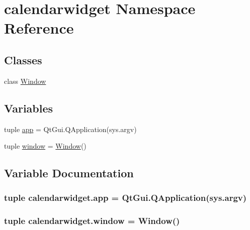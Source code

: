 \hypertarget{namespacecalendarwidget}{}\section{calendarwidget Namespace Reference}
\label{namespacecalendarwidget}
\subsection*{Classes}
\begin{DoxyCompactItemize}
\item 
class \hyperlink{classcalendarwidget_1_1Window}{Window}
\end{DoxyCompactItemize}
\subsection*{Variables}
\begin{DoxyCompactItemize}
\item 
tuple \hyperlink{namespacecalendarwidget_abebdb6897473e3b5be8ebdb33fcf8c40}{app} = Qt\+Gui.\+Q\+Application(sys.\+argv)
\item 
tuple \hyperlink{namespacecalendarwidget_abb4fac91e4aec59732bb5047f4c06e51}{window} = \hyperlink{classcalendarwidget_1_1Window}{Window}()
\end{DoxyCompactItemize}


\subsection{Variable Documentation}
\hypertarget{namespacecalendarwidget_abebdb6897473e3b5be8ebdb33fcf8c40}{}
\subsubsection[{app}]{\setlength{\rightskip}{0pt plus 5cm}tuple calendarwidget.\+app = Qt\+Gui.\+Q\+Application(sys.\+argv)}\label{namespacecalendarwidget_abebdb6897473e3b5be8ebdb33fcf8c40}
\hypertarget{namespacecalendarwidget_abb4fac91e4aec59732bb5047f4c06e51}{}
\subsubsection[{window}]{\setlength{\rightskip}{0pt plus 5cm}tuple calendarwidget.\+window = {\bf Window}()}\label{namespacecalendarwidget_abb4fac91e4aec59732bb5047f4c06e51}
